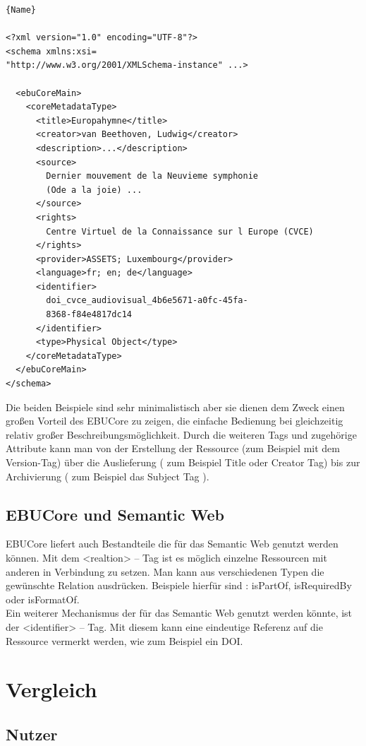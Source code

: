 \begin{lstlisting}[caption=Beispiel-XML EBUCore für die Europahymne]{Name}

<?xml version="1.0" encoding="UTF-8"?>
<schema xmlns:xsi=
"http://www.w3.org/2001/XMLSchema-instance" ...>

  <ebuCoreMain>
    <coreMetadataType>
      <title>Europahymne</title>
      <creator>van Beethoven, Ludwig</creator>
      <description>...</description>
      <source>
      	Dernier mouvement de la Neuvieme symphonie 
      	(Ode a la joie) ...
      </source>  
      <rights>
      	Centre Virtuel de la Connaissance sur l Europe (CVCE)
      </rights>
      <provider>ASSETS; Luxembourg</provider>
      <language>fr; en; de</language>
      <identifier>
      	doi_cvce_audiovisual_4b6e5671-a0fc-45fa-
      	8368-f84e4817dc14
      </identifier>
      <type>Physical Object</type>
    </coreMetadataType>
  </ebuCoreMain>
</schema>
\end{lstlisting}

Die beiden Beispiele sind sehr minimalistisch aber sie dienen dem Zweck einen großen Vorteil des EBUCore zu zeigen, die einfache Bedienung bei gleichzeitig relativ großer Beschreibungsmöglichkeit. Durch die weiteren Tags und zugehörige Attribute kann man von der Erstellung der Ressource (zum Beispiel mit dem Version-Tag) über die Auslieferung ( zum Beispiel Title oder Creator Tag)  bis zur Archivierung ( zum Beispiel das Subject Tag ).
\subsection{EBUCore und Semantic Web}

EBUCore liefert auch Bestandteile die für das Semantic Web genutzt werden können. Mit dem <realtion> -- Tag ist es möglich einzelne Ressourcen mit anderen in Verbindung zu setzen. Man kann aus verschiedenen Typen die gewünschte Relation ausdrücken. Beispiele hierfür sind : isPartOf, isRequiredBy oder isFormatOf.\\
Ein weiterer Mechanismus der für das Semantic Web genutzt werden könnte, ist der <identifier> -- Tag. Mit diesem kann eine eindeutige Referenz auf die Ressource vermerkt werden, wie zum Beispiel ein DOI.
	\newpage
	\section{Vergleich}
	\subsection{Nutzer}
